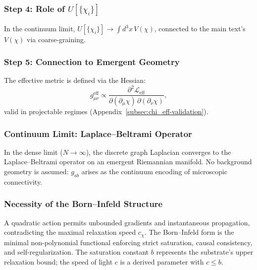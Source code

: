 \subsubsection*{Step 4: Role of $U[\{\chi_i\}]$}
\label{subsec:A12-potential-role_v171}

In the continuum limit,
$U[\{\chi_i\}] \to \int d^3x\,V(\chi)$,
connected to the main text's $V(\chi)$ via coarse-graining.

\subsubsection*{Step 5: Connection to Emergent Geometry}
\label{subsec:A12-emergent-geometry_v171}

The effective metric is defined via the Hessian:
\begin{equation}
  g_{\mu\nu}^{\text{eff}}
  \propto
  \frac{\partial^2\mathcal{L}_{\text{eff}}}
       {\partial(\partial_\mu\chi)\,
        \partial(\partial_\nu\chi)},
  \label{eq:A12-emergent-metric_v171}
\end{equation}
valid in projectable regimes
(Appendix~\ref{subsec:chi_eff-validation}).

\subsubsection*{Continuum Limit: Laplace--Beltrami Operator}
\label{subsec:A12-continuum-limit}

In the dense limit ($N \to \infty$), the discrete graph Laplacian
converges to the Laplace--Beltrami operator on an emergent Riemannian
manifold.
No background geometry is assumed: $g_{ab}$ arises as the continuum
encoding of microscopic connectivity.

\subsubsection*{Necessity of the Born--Infeld Structure}
\label{subsec:A12-born-infeld-necessity}

A quadratic action permits unbounded gradients and instantaneous
propagation, contradicting the maximal relaxation speed $c_\chi$.
The Born--Infeld form is the minimal non-polynomial functional
enforcing strict saturation, causal consistency, and
self-regularization.
The saturation constant $b$ represents the substrate's upper
relaxation bound; the speed of light $c$ is a derived parameter with
$c \le b$.
